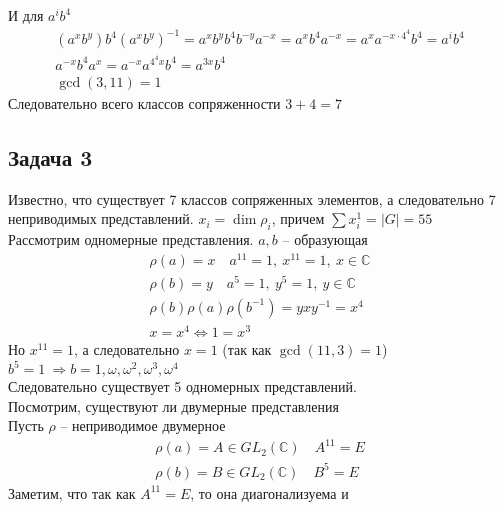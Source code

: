 	И для $a^i b^4$
	\begin{gather*}
		(a^x b^y) b^4 (a^x b^y)^{-1} = a^x b^y b^4 b^{-y} a^{-x} = a^x b^4 a^{-x} = a^{x} a^{-x \cdot 4^4} b^4 = a^{i} b^4\\
		a^{-x} b^4 a^{x} = a^{-x} a^{4^4 x} b^4 = a^{3x} b^4\\
		\operatorname{gcd}(3,11)=1
	\end{gather*}
	Следовательно всего классов сопряженности $3 + 4 = 7$
	
	
\newpage
\subsection*{Задача 3}
	Известно, что существует 7 классов сопряженных элементов, а следовательно 7 неприводимых представлений. $x_i = \dim \rho_i$, причем $\sum x_i^1 = |G| = 55$\\
	Рассмотрим одномерные представления. $a,b$ -- образующая
	\begin{gather*}
		\rho(a) = x\quad a^{11} = 1,\ x^{11} = 1,\ x \in \mathbb{C}\\
		\rho(b) = y\quad a^{5} = 1,\ y^{5} = 1,\ y \in \mathbb{C}\\
		\rho(b) \rho(a) \rho(b^{-1}) = yxy^{-1} = x^{4}\\
		x = x^{4} \Leftrightarrow 1 = x^{3}
	\end{gather*}
	Но $x^{11} = 1$, а следовательно $x=1$ (так как $\operatorname{gcd}(11,3) = 1$)\\
	$b^5 = 1\ \Rightarrow b = 1, \omega, \omega^{2}, \omega^{3}, \omega^{4}$\\
	Следовательно существует 5 одномерных представлений.\\
	Посмотрим, существуют ли двумерные представления\\
	Пусть $\rho$ -- неприводимое двумерное
	\begin{gather*}
		\rho(a) = A \in GL_2(\mathbb{C})\quad A^{11} = E\\
		\rho(b) = B \in GL_2(\mathbb{C})\quad B^{5} = E
	\end{gather*}
	Заметим, что так как $A^{11} = E$, то она диагонализуема и
